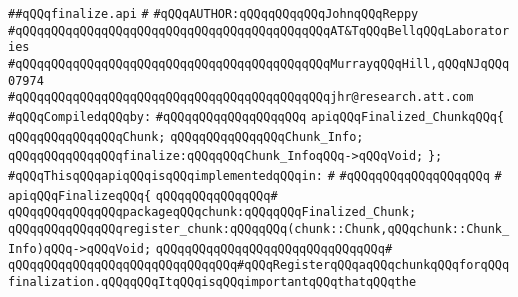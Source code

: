 \label{src/lib/src/finalize.api}
\verb|##qQQqfinalize.api|\newline
\verb|#|\newline
\verb|#qQQqAUTHOR:qQQqqQQqqQQqJohnqQQqReppy|\newline
\verb|#qQQqqQQqqQQqqQQqqQQqqQQqqQQqqQQqqQQqqQQqqQQqAT&TqQQqBellqQQqLaboratories|\newline
\verb|#qQQqqQQqqQQqqQQqqQQqqQQqqQQqqQQqqQQqqQQqqQQqMurrayqQQqHill,qQQqNJqQQq07974|\newline
\verb|#qQQqqQQqqQQqqQQqqQQqqQQqqQQqqQQqqQQqqQQqqQQqjhr@research.att.com|\newline
\newline
\verb|#qQQqCompiledqQQqby:|\newline
\verb|#qQQqqQQqqQQqqQQqqQQq|\newline
\newline
\newline
\newline
\verb|apiqQQqFinalized_ChunkqQQq{|\newline
\newline
\verb|qQQqqQQqqQQqqQQqChunk;|\newline
\verb|qQQqqQQqqQQqqQQqChunk_Info;|\newline
\newline
\verb|qQQqqQQqqQQqqQQqfinalize:qQQqqQQqChunk_InfoqQQq->qQQqVoid;|\newline
\newline
\verb|};|\newline
\newline
\verb|#qQQqThisqQQqapiqQQqisqQQqimplementedqQQqin:|\newline
\verb|#|\newline
\verb|#qQQqqQQqqQQqqQQqqQQq|\newline
\verb|#|\newline
\verb|apiqQQqFinalizeqQQq{|\newline
\verb|qQQqqQQqqQQqqQQq#|\newline
\verb|qQQqqQQqqQQqqQQqpackageqQQqchunk:qQQqqQQqFinalized_Chunk;|\newline
\newline
\verb|qQQqqQQqqQQqqQQqregister_chunk:qQQqqQQq(chunk::Chunk,qQQqchunk::Chunk_Info)qQQq->qQQqVoid;|\newline
\verb|qQQqqQQqqQQqqQQqqQQqqQQqqQQqqQQq#|\newline
\verb|qQQqqQQqqQQqqQQqqQQqqQQqqQQqqQQq#qQQqRegisterqQQqaqQQqchunkqQQqforqQQqfinalization.qQQqqQQqItqQQqisqQQqimportantqQQqthatqQQqthe|\newline
